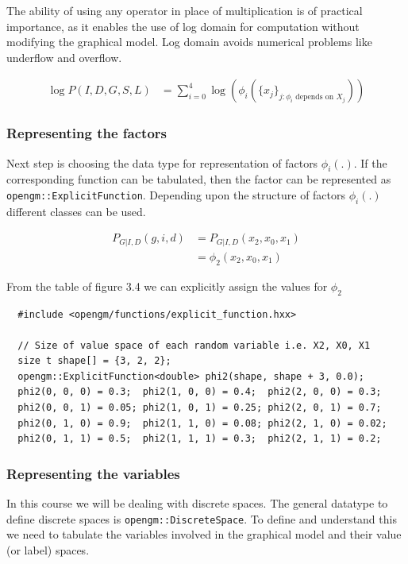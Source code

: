 \documentclass[12pt,oneside,letterpaper]{article}
\begin{document}
The ability of using any operator in place of multiplication is of practical
importance, as it enables the use of log domain for computation without
modifying the graphical model. Log domain avoids numerical problems like
underflow and overflow.

\begin{align}
  \log P(I, D, G, S, L) &= \sum_{i=0}^{4} \log( \phi_i(\{ x_j \}_{j : \phi_i \text{ depends on } X_j}) )
  \label{eq:factorization}
\end{align}

\subsubsection{Representing the factors} 

Next step is choosing the data type for representation of factors $\phi_i(.)$.
If the corresponding function can be tabulated, then the factor can be
represented as \lstinline|opengm::ExplicitFunction|. Depending upon the structure of 
factors $\phi_i(.)$ different classes can be used. 

\begin{align}
  P_{G|I,D}(g, i, d) &= P_{G|I,D}(x_2, x_0, x_1) \\
                     &= \phi_2(x_2, x_0, x_1)
\end{align}

From the table of figure 3.4 we can explicitly assign the values for $\phi_2$

\begin{lstlisting}
  #include <opengm/functions/explicit_function.hxx>

  // Size of value space of each random variable i.e. X2, X0, X1
  size t shape[] = {3, 2, 2};
  opengm::ExplicitFunction<double> phi2(shape, shape + 3, 0.0);
  phi2(0, 0, 0) = 0.3;  phi2(1, 0, 0) = 0.4;  phi2(2, 0, 0) = 0.3;
  phi2(0, 0, 1) = 0.05; phi2(1, 0, 1) = 0.25; phi2(2, 0, 1) = 0.7;
  phi2(0, 1, 0) = 0.9;  phi2(1, 1, 0) = 0.08; phi2(2, 1, 0) = 0.02;
  phi2(0, 1, 1) = 0.5;  phi2(1, 1, 1) = 0.3;  phi2(2, 1, 1) = 0.2;
\end{lstlisting}


\subsubsection{Representing the variables}

In this course we will be dealing with discrete spaces. The general datatype to
define discrete spaces is \lstinline|opengm::DiscreteSpace|. To define and
understand this we need to tabulate the variables involved in the graphical
model and their value (or label) spaces.
\end{document}
